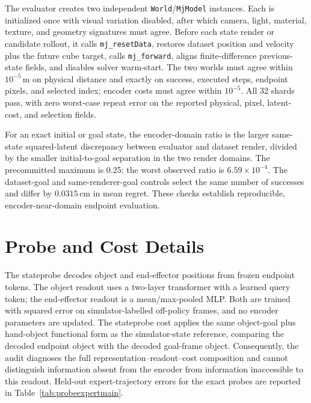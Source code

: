 \documentclass[10pt]{article}
\begin{document}
The evaluator creates two independent \texttt{World}/\texttt{MjModel}
instances. Each is initialized once with visual variation disabled, after which
camera, light, material, texture, and geometry signatures must agree. Before
each state render or candidate rollout, it calls \texttt{mj\_resetData}, restores
dataset position and velocity plus the future cube target, calls
\texttt{mj\_forward}, aligns finite-difference previous-state fields, and
disables solver warm-start. The two worlds must agree within $10^{-5}$\,m on
physical distance and exactly on success, executed steps, endpoint pixels, and
selected index; encoder costs must agree within $10^{-5}$. All 32 shards pass,
with zero worst-case repeat error on the reported physical, pixel, latent-cost,
and selection fields.

For an exact initial or goal state, the encoder-domain ratio is the larger
same-state squared-latent discrepancy between evaluator and dataset render,
divided by the smaller initial-to-goal separation in the two render domains.
The precommitted maximum is 0.25; the worst observed ratio is
$6.59\times10^{-4}$. The dataset-goal and same-renderer-goal controls select the
same number of successes and differ by $0.0315$\,cm in mean regret. These checks
establish reproducible, encoder-near-domain endpoint evaluation.

\section{Probe and Cost Details}\label{app:probe}

The stateprobe decodes object and end-effector positions from frozen endpoint
tokens. The object readout uses a two-layer transformer with a learned query
token; the end-effector readout is a mean/max-pooled MLP. Both are trained with
squared error on simulator-labelled off-policy frames, and no encoder
parameters are updated. The stateprobe cost applies the same object-goal plus
hand-object functional form as the simulator-state reference, comparing the
decoded endpoint object with the decoded goal-frame object.
Consequently, the audit diagnoses the full representation--readout--cost
composition and cannot distinguish information absent from the encoder from
information inaccessible to this readout.
Held-out expert-trajectory errors for the exact probes are reported in
Table~\ref{tab:probeexpertmain}.
\end{document}
